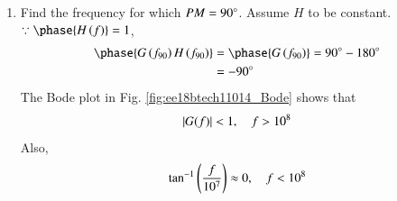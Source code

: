 \begin{enumerate}[label=\thesection.\arabic*.,ref=\thesection.\theenumi]
\item Find the frequency for which $PM = 90 \degree$.  Assume $H$ to be constant.
\\
\solution $\because \phase{H\brak{f}} = 1$, 
\begin{align}
\phase{G\brak{f_{90}}H\brak{f_{90}}} &= \phase{G\brak{f_{90}}} = 90\degree - 180\degree
\\
&= -90\degree
\label{eq:ee18btech11014_Gpm90}
\end{align}
%
The Bode plot in Fig. 	\ref{fig:ee18btech11014_Bode} shows that 
\begin{align}
\left\vert G(f)\right\vert < 1, \quad f > 10^8
\end{align}
%
Also, 
\begin{align}
\tan^{-1}\left(\frac{f}{10^{7}}\right) \approx 0, \quad f < 10^8
\end{align}


\end{enumerate}
